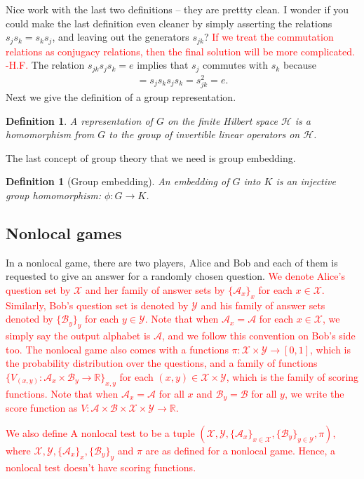 \documentclass[11pt,letterpaper]{article}
\newcommand{\R}{\mathbb{R}}
\newcommand{\calH}{\mathcal{H}}
\newcommand{\calX}{\mathcal{X}}
\newcommand{\calY}{\mathcal{Y}}
\newcommand{\calA}{\mathcal{A}}
\newcommand{\calB}{\mathcal{B}}
\newcommand{\1}{\mathbb{1}}
\def\carl#1{{\color{blue} #1}}
\newcommand{\hf}[1]{\textcolor{red}{#1}}
\newcommand{\hfc}[1]{\textcolor{red}{#1 -H.F.}}
\newtheorem{definition}[theorem]{Definition}
\theoremstyle{definition}
\begin{document}
\carl{Nice work with the last two definitions -- they are prettty clean.  I wonder if you could make the last definition even cleaner by simply asserting the relations $s_j s_k = s_k s_j$, and leaving out the generators $s_{jk}$?}
\hfc{If we treat the commutation relations as conjugacy relations, then the final solution will be more complicated.}
The relation $s_{jk} s_js_k = e$ implies that $s_j$ commutes with $s_k$
because
\begin{align*}
    [s_j, s_k] = s_js_ks_js_k = s_{jk}^2 = e.
\end{align*}
Next we give the definition of a group representation. 
\begin{definition}
    A representation of $G$ on the finite Hilbert space $\calH$ is a homomorphism from $G$ to the group of invertible linear operators on $\calH$. 
\end{definition}
The last concept of group theory that we need is group embedding.
\begin{definition}[Group embedding]
    An embedding of $G$ into $K$ is an injective group homomorphism: $\phi: G \rightarrow K$.
\end{definition}
\subsection{Nonlocal games}
In a nonlocal game, there are two players, Alice and Bob and each of them is requested
to give an answer for a randomly chosen question. 
\hf{We denote Alice's question set by $\calX$ and her family of answer sets by $\{\calA_x\}_x$
for each $x \in \calX$. Similarly,
Bob's question set is denoted by $\calY$ and his family of answer sets denoted by $\{\calB_y\}_y$ for each $y \in \calY$. 
Note that when $\calA_x = \calA$ for each $x \in \calX$, we simply say the output alphabet is $\calA$, and we follow this convention on Bob's side too.
The nonlocal game also
comes with a functions $\pi: \calX \times \calY \rightarrow [0,1]$, which is the probability distribution over the questions,
and a family of functions $\{ V_{(x,y)} : \calA_x \times \calB_y \rightarrow \R \}_{x,y}$ for each $(x,y) \in \calX \times \calY$, which is 
the family of scoring functions.
Note that when $\calA_x = \calA$ for all $x$ and $\calB_y = \calB$ for all $y$, we write the score function as 
$V: \calA \times \calB \times \calX \times \calY \rightarrow \R$.
}


\hf{We also define A nonlocal test 
to be a tuple $(\calX, \calY, \{\calA_x\}_{x \in \calX}, \{\calB_y\}_{y \in \calY}, \pi)$, where
$\calX, \calY, \{\calA_x\}_{x}, \{\calB_y\}_{y}$ and $\pi$ are as defined for a nonlocal game.
Hence, a nonlocal test doesn't have scoring functions.
}
\end{document}

